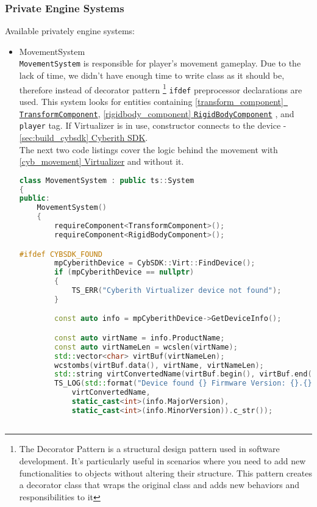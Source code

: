 \subsubsection{Private Engine Systems}
Available privately engine systems:
\begin{itemize}
    \item MovementSystem\\
    \label{movement_system}
    \texttt{MovementSystem} is responsible for player's movement gameplay. Due to the lack of time, we didn't have enough time to write class as it should be, therefore instead of decorator pattern \footnote{The Decorator Pattern is a structural design pattern used in software development. It's particularly useful in scenarios where you need to add new functionalities to objects without altering their structure. This pattern creates a decorator class that wraps the original class and adds new behaviors and responsibilities to it} \texttt{ifdef} preprocessor declarations are used.
    This system looks for entities containing \hyperref[transform_component] {\ref*{transform_component}\texttt{ TransformComponent}}, \hyperref[rigidbody_component]{\ref*{rigidbody_component} \texttt{RigidBodyComponent}} , and \texttt{player} tag. If Virtualizer is in use, constructor connects to the device - \hyperref[sec:build_cybsdk]{\ref*{sec:build_cybsdk} Cyberith SDK}.\\ The next two code listings cover the logic behind the movement with \hyperref[cyb_movement]{\ref*{cyb_movement} Virtualizer} and without it.
\begin{lstlisting}[language=c++, caption=\texttt{Movementsystem} class (./engine/src/ecs/systems/movement\_system.hpp)]
class MovementSystem : public ts::System
{
public:
    MovementSystem()
    {
        requireComponent<TransformComponent>();
        requireComponent<RigidBodyComponent>();

#ifdef CYBSDK_FOUND
        mpCyberithDevice = CybSDK::Virt::FindDevice();
        if (mpCyberithDevice == nullptr)
        {
            TS_ERR("Cyberith Virtualizer device not found");
        }

        const auto info = mpCyberithDevice->GetDeviceInfo();

        const auto virtName = info.ProductName;
        const auto virtNameLen = wcslen(virtName);
        std::vector<char> virtBuf(virtNameLen);
        wcstombs(virtBuf.data(), virtName, virtNameLen);
        std::string virtConvertedName(virtBuf.begin(), virtBuf.end());
        TS_LOG(std::format("Device found {} Firmware Version: {}.{}",
            virtConvertedName,
            static_cast<int>(info.MajorVersion),
            static_cast<int>(info.MinorVersion)).c_str());



\end{lstlisting}
\end{itemize}
